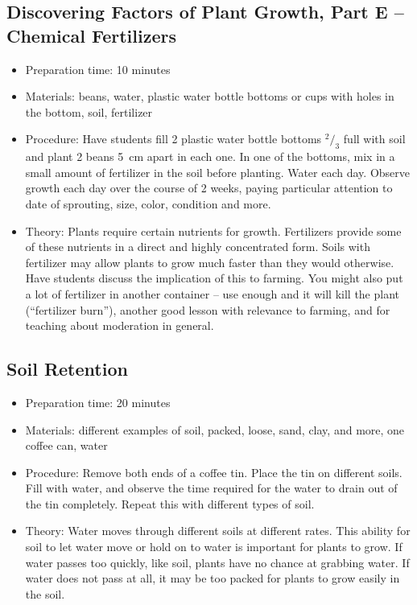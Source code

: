 \subsection{Discovering Factors of Plant Growth, Part E -- Chemical Fertilizers}
\begin{itemize}
\item{Preparation time: 10 minutes}
\item{Materials: beans, water, plastic water bottle bottoms or cups with holes in the bottom, soil, fertilizer}
\item{Procedure: Have students fill 2 plastic water bottle bottoms $^2/_3$ full with soil and plant 2 beans 5~cm apart in each one. In one of the bottoms, mix in a small amount of fertilizer in the soil before planting. Water each day. Observe growth each day over the course of 2 weeks, paying particular attention to date of sprouting, size, color, condition and more.}
\item{Theory: Plants require certain nutrients for growth. Fertilizers provide some of these nutrients in a direct and highly concentrated form. Soils with fertilizer may allow plants to grow much faster than they would otherwise. Have students discuss the implication of this to farming. You might also put a lot of fertilizer in another container -- use enough and it will kill the plant (``fertilizer burn''), another good lesson with relevance to farming, and for teaching about moderation in general.}
\end{itemize}

\subsection{Soil Retention}
\begin{itemize}
\item{Preparation time: 20 minutes}
\item{Materials: different examples of soil, packed, loose, sand, clay, and more, one coffee can, water}
\item{Procedure: Remove both ends of a coffee tin. Place the tin on different soils. Fill with water, and observe the time required for the water to drain out of the tin completely. Repeat this with different types of soil.}
\item{Theory: Water moves through different soils at different rates. This ability for soil to let water move or hold on to water is important for plants to grow. If water passes too quickly, like soil, plants have no chance at grabbing water. If water does not pass at all, it may be too packed for plants to grow easily in the soil.}
\end{itemize}


